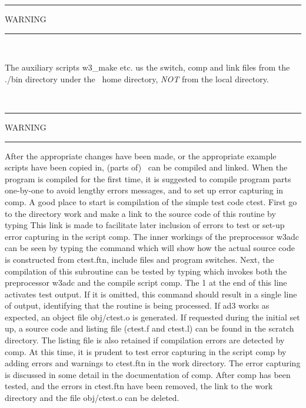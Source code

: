 \vspace{\baselineskip}

\begin{center}
\rule[1mm]{55mm}{1.0mm} WARNING \rule[1mm]{55mm}{1.0mm} \\ 
\vspace{\baselineskip}
\parbox{120mm}{The auxiliary scripts {\file w3\_make} etc. us the {\file
  switch}, {\file comp} and {\file link} files from the {\file ./bin}
  directory under the \ws\ home directory, {\it NOT} from the local
  directory.} \\ \vspace{\baselineskip} \rule[1mm]{55mm}{1.0mm} WARNING
  \rule[1mm]{55mm}{1.0mm}
\end{center}

\noindent
After the appropriate changes have been made, or the appropriate example
scripts have been copied in, (parts of) \ws\ can be compiled and linked. When
the program is compiled for the first time, it is suggested to compile program
parts one-by-one to avoid lengthy errors messages, and to set up error
capturing in {\file comp}. A good place to start is compilation of the simple
test code {\F ctest}. First go to the directory {\dir work} and make a link to
the source code of this routine by typing  This link is
made to facilitate later inclusion of errors to test or set-up error capturing
in the script {\file comp}. The inner workings of the preprocessor {\file
w3adc} can be seen by typing the command  which will
show how the actual source code is constructed from {\file ctest.ftn}, include
files and program switches. Next, the compilation of this subroutine can be
tested by typing  which invokes both the preprocessor
{\file w3adc} and the compile script {\file comp}. The 1 at the end of this
line activates test output. If it is omitted, this command should result in a
single line of output, identifying that the routine is being processed. If
{\file ad3} works as expected, an object file {\file obj/ctest.o} is
generated. If requested during the initial set up, a source code and listing
file ({\file ctest.f} and {\file ctest.l}) can be found in the scratch
directory. The listing file is also retained if compilation errors are
detected by {\file comp}. At this time, it is prudent to test error capturing
in the script {\file comp} by adding errors and warnings to {\file ctest.ftn}
in the work directory. The error capturing is discussed in some detail in the
documentation of {\file comp}. After {\file comp} has been tested, and the
errors in {\file ctest.ftn} have been removed, the link to the work directory
and the file {\file obj/ctest.o} can be deleted.

